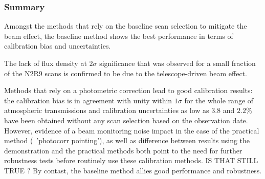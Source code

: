 \subsubsection{Summary}

Amongst the methods that rely on the baseline scan selection to
mitigate the beam effect, the baseline method shows the best
performance in terms of calibration bias and uncertainties.

The lack of flux density at $2\sigma$ significance that was observed
for a small fraction of the N2R9 scans is confirmed to be due to the
telescope-driven beam effect.

Methods that rely on a photometric correction lead to good calibration
results: the calibration bias is in agreement with unity within
$1\sigma$ for the whole range of atmospheric transmissions and
calibration uncertainties as low as $3.8$ and $2.2\%$ have been obtained
without any scan selection based on the observation date. {\color{magenta}However,
evidence of a beam monitoring noise impact in the case of the
practical method (\aka\ 'photocorr pointing'), as well as difference
between results using the demonstration and the practical methods both
point to the need for further robustness tests before routinely use
these calibration methods. IS THAT STILL TRUE ?}
By contast, the baseline method allies good
performance and robustness.    








